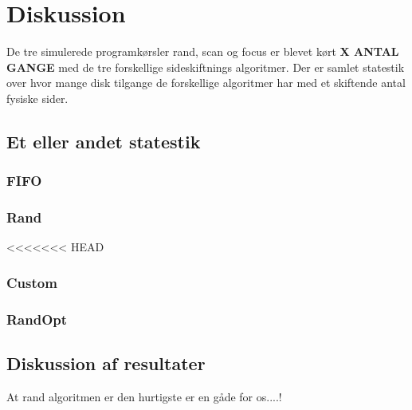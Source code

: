 \section{Diskussion}
De tre simulerede programkørsler rand, scan og focus er blevet kørt \textbf{X ANTAL GANGE} med de tre forskellige sideskiftnings algoritmer. Der er samlet statestik over hvor mange disk tilgange de forskellige algoritmer har med et skiftende antal fysiske sider.

\subsection{Et eller andet statestik}

\subsubsection{FIFO}

\subsubsection{Rand}
<<<<<<< HEAD

\subsubsection{Custom}

\subsubsection{RandOpt}

\subsection{Diskussion af resultater}
At rand algoritmen er den hurtigste er en gåde for os....!
